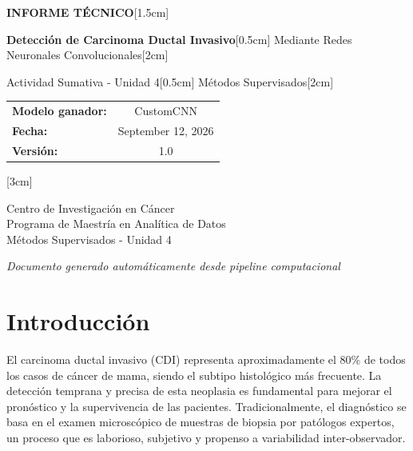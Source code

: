 \documentclass[12pt,a4paper]{article}
\begin{document}
\begin{titlepage}
    \centering
    \vspace*{3cm}
    
    {\LARGE \textbf{INFORME TÉCNICO}}[1.5cm]
    
    {\huge \textbf{Detección de Carcinoma Ductal Invasivo}}[0.5cm]
    {\Large Mediante Redes Neuronales Convolucionales}[2cm]
    
    {\large Actividad Sumativa - Unidad 4}[0.5cm]
    {\large Métodos Supervisados}[2cm]
    
    {\normalsize 
    \begin{tabular}{lc}
        \textbf{Modelo ganador:} & CustomCNN \\
        \textbf{Fecha:} & September 12, 2026 \\
        \textbf{Versión:} & 1.0
    \end{tabular}
    }[3cm]
    
    {\normalsize 
    Centro de Investigación en Cáncer \\
    Programa de Maestría en Analítica de Datos \\
    Métodos Supervisados - Unidad 4
    }
    
    \vfill
    
    {\textit{Documento generado automáticamente desde pipeline computacional}}
    
\end{titlepage}

\newpage
\tableofcontents
\newpage

\section{Introducción}
\label{sec:introduccion}

El carcinoma ductal invasivo (CDI) representa aproximadamente el 80\% de todos los casos de cáncer de mama, 
siendo el subtipo histológico más frecuente. La detección temprana y precisa de esta neoplasia es fundamental 
para mejorar el pronóstico y la supervivencia de las pacientes. Tradicionalmente, el diagnóstico se basa en 
el examen microscópico de muestras de biopsia por patólogos expertos, un proceso que es laborioso, 
subjetivo y propenso a variabilidad inter-observador.
\end{document}
